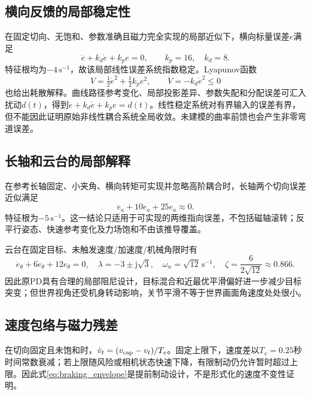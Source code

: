 \documentclass[UTF8,a4paper,zihao=5,fontset=windows]{ctexart}
\newcommand{\unit}[1]{\,\mathrm{#1}}
\begin{document}
\subsection{横向反馈的局部稳定性}
在固定切向、无饱和、参数准确且磁力完全实现的局部近似下，横向标量误差$e$满足
\begin{equation}
\ddot e+k_d\dot e+k_pe=0,\qquad k_p=16,\quad k_d=8.
\label{eq:lateral_stability}
\end{equation}
特征根均为$-4\unit{s^{-1}}$，故该局部线性误差系统指数稳定。Lyapunov函数
\begin{equation}
V=\tfrac12\dot e^2+\tfrac12k_pe^2,\qquad \dot V=-k_d\dot e^2\le0
\label{eq:lyapunov}
\end{equation}
也给出耗散解释。曲线路径参考变化、局部投影差异、参数失配和分配误差可汇入扰动$d(t)$，得到$\ddot e+k_d\dot e+k_pe=d(t)$。线性稳定系统对有界输入的误差有界，但不能因此证明原始非线性耦合系统全局收敛。未建模的曲率前馈也会产生非零弯道误差。

\subsection{长轴和云台的局部解释}
在参考长轴固定、小夹角、横向转矩可实现并忽略高阶耦合时，长轴两个切向误差近似满足
\begin{equation}
\ddot e_a+10\dot e_a+25e_a\approx0.
\end{equation}
特征根为$-5\unit{s^{-1}}$。这一结论只适用于可实现的两维指向误差，不包括磁轴滚转；反平行姿态、快速参考变化及力场饱和不由该推导覆盖。

云台在固定目标、未触发速度/加速度/机械角限时有
\begin{equation}
\ddot e_\theta+6\dot e_\theta+12e_\theta=0,\quad
\lambda=-3\pm\mathrm j\sqrt3,\quad\omega_n=\sqrt{12}\unit{s^{-1}},\quad\zeta=\frac6{2\sqrt{12}}\approx0.866.
\label{eq:gimbal_stability}
\end{equation}
因此原PD具有合理的局部阻尼设计，目标混合和近最优平滑偏好进一步减少目标突变；但世界视角还受机身转动影响，关节平滑不等于世界画面角速度处处很小。

\subsection{速度包络与磁力残差}
在切向固定且未饱和时，$\dot v_t=(v_{\rm cap}-v_t)/T_v$。固定上限下，速度差以$T_v=0.25$秒时间常数衰减；若上限随风险或相机状态快速下降，有限制动仍允许暂时超过上限。因此式\eqref{eq:braking_envelope}是提前制动设计，不是形式化的速度不变性证明。
\end{document}
